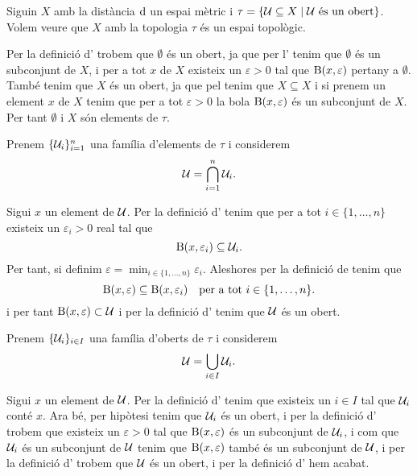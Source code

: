 \documentclass[../../Main.tex]{subfiles}
\begin{document}
	\begin{example}
		\label{ex:topologia induida per una mètrica}
		Siguin \(X\) amb la distància \(\operatorname{d}\) un espai mètric i \(\tau=\{\mathcal{U}\subseteq X\mid \mathcal{U}\text{ és un obert}\}\). Volem veure que \(X\) amb la topologia \(\tau\) és un espai topològic.
		\begin{solution}
			Per la definició d' trobem que \(\emptyset\) és un obert, ja que per l' tenim que \(\emptyset\) és un subconjunt de \(X\), i per a tot \(x\) de \(X\) existeix un \(\varepsilon>0\) tal que \(\operatorname{B}(x,\varepsilon)\) pertany a \(\emptyset\). També tenim que \(X\) és un obert, ja que pel  tenim que \(X\subseteq X\) i si prenem un element \(x\) de \(X\) tenim que per a tot \(\varepsilon>0\) la bola \(\operatorname{B}(x,\varepsilon)\) és un subconjunt de \(X\). Per tant \(\emptyset\) i \(X\) són elements de \(\tau\).
			
			Prenem \(\{\mathcal{U}_{i}\}_{i=1}^{n}\) una família d'elements de \(\tau\) i considerem
			\[
			    \mathcal{U}=\bigcap_{i=1}^{n}\mathcal{U}_{i}.
			\]
			
			Sigui \(x\) un element de \(\mathcal{U}\). Per la definició d' tenim que per a tot \(i\in\{1,\dots,n\}\) existeix un \(\varepsilon_{i}>0\) real tal que
			\[
			    \operatorname{B}(x,\varepsilon_{i})\subseteq\mathcal{U}_{i}.
			\]
			Per tant, si definim \(\varepsilon=\min_{i\in\{1,\dots,n\}}\varepsilon_{i}\). Aleshores per la definició de  tenim que
			\[
			    \operatorname{B}(x,\varepsilon)\subseteq\operatorname{B}(x,\varepsilon_{i})\quad\text{per a tot }i\in\{1,\dots,n\}.
			\]
			i per tant \(\operatorname{B}(x,\varepsilon)\subset\mathcal{U}\) i per la definició d' tenim que \(\mathcal{U}\) és un obert.
			
			Prenem \(\{\mathcal{U}_{i}\}_{i\in I}\) una família d'oberts de \(\tau\) i considerem
			\[
			    \mathcal{U}=\bigcup_{i\in I}\mathcal{U}_{i}.
			\]
			
			Sigui \(x\) un element de \(\mathcal{U}\). Per la definició d' tenim que existeix un \(i\in I\) tal que \(\mathcal{U}_{i}\) conté \(x\). Ara bé, per hipòtesi tenim que \(\mathcal{U}_{i}\) és un obert, i per la definició d' trobem que existeix un \(\varepsilon>0\) tal que \(\operatorname{B}(x,\varepsilon)\) és un subconjunt de \(\mathcal{U}_{i}\), i com que \(\mathcal{U}_{i}\) és un subconjunt de \(\mathcal{U}\) tenim que \(\operatorname{B}(x,\varepsilon)\) també és un subconjunt de \(\mathcal{U}\), i per la definició d' trobem que \(\mathcal{U}\) és un obert, i per la definició d' hem acabat.
		\end{solution}
	\end{example}
\end{document}
